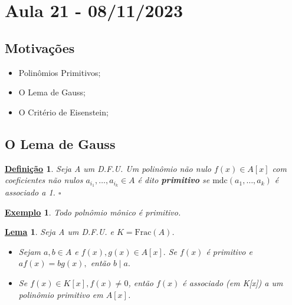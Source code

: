 \documentclass{article}
\newtheorem*{def*}{\underline{Defini\c c\~ao}}
\newtheorem*{lemma*}{\underline{Lema}}
\newtheorem{example}{\underline{Exemplo}}
\begin{document}
\section{Aula 21 - 08/11/2023}
\subsection{Motivações} 
\begin{itemize}
  \item Polinômios Primitivos;
  \item O Lema de Gauss;
  \item O Critério de Eisenstein;
\end{itemize}
\subsection{O Lema de Gauss}
\begin{def*}
  Seja A um D.F.U. Um polinômio não nulo \(f(x)\in A[x]\) com coeficientes não nulos \(a_{i_{1}},\dotsc, a_{i_{k}}\in A\) é dito
 \textbf{primitivo} se \(\mathrm{mdc}(a_{1}, \dotsc, a_{k})\) é associado a 1. \(\square\)
\end{def*}
\begin{example}
  Todo polnômio mônico é primitivo.
\end{example}
\begin{lemma*}
  Seja A um D.F.U. e \(K = \mathrm{Frac}(A)\).
 \begin{itemize}
  \item[1)] Sejam \(a, b\in A\) e \(f(x), g(x)\in A[x].\) Se \(f(x)\) é primitivo e \(af(x) = bg(x),\)
 então \(b\mid a.\)
  \item[2)] Se \(f(x)\in K[x], f(x)\neq 0\), então \(f(x)\) é associado (em K[x]) a um polinômio primitivo em \(A[x]\).
 \end{itemize}
\end{lemma*}
\end{document}
